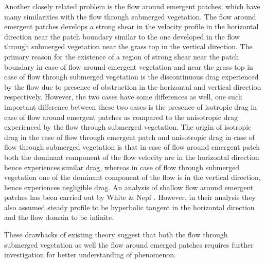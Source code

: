 \documentclass[12pt]{report}   %
\begin{document}
Another closely related problem is the flow around emergent patches, which have many similarities with the flow through submerged vegetation. The flow around emergent patches develops a strong shear in the velocity profile in the horizontal direction near the patch boundary similar to the one developed in the flow through submerged vegetation near the grass top in the vertical direction. The primary reason for the existence of a region of strong shear near the patch boundary in case of flow around emergent vegetation and near the grass top in case of flow through submerged vegetation is the discontinuous drag
experienced by the flow due to presence of obstruction in the horizontal and vertical direction respectively. However, the two cases have some differences as well, one such important difference between these two cases is the presence of isotropic drag in case of flow around emergent patches as compared to the anisotropic drag experienced by the flow through submerged vegetation. The origin of isotropic drag in the case of flow through emergent patch and anisotropic drag in case of flow through submerged vegetation is that in case of flow around emergent patch both the dominant component of the flow velocity are in the horizontal direction hence experiences similar drag, whereas in case of flow through submerged vegetation one of the dominant component of the flow is in the vertical direction, hence experiences negligible drag. An analysis of shallow flow around emergent patches has been carried out by White $\&$ Nepf \cite{White07}. However, in their analysis they also assumed steady profile to be hyperbolic 
tangent in the horizontal direction and the flow domain to be infinite.



These drawbacks of existing theory suggest that both the flow through submerged vegetation as well the flow around emerged patches requires further investigation for better understanding of phenomenon.
\end{document}

